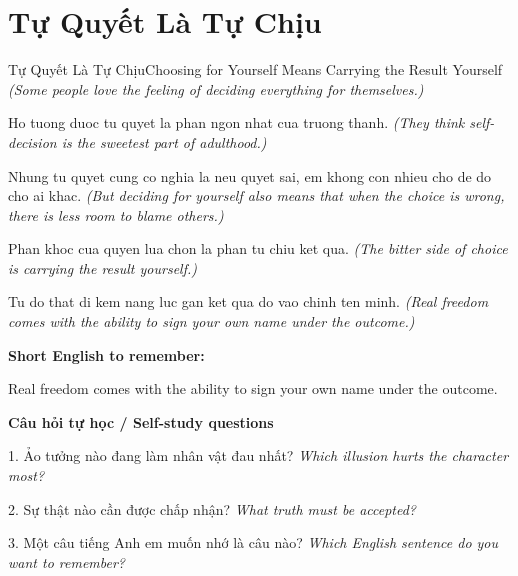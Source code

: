 \section{Tự Quyết Là Tự Chịu}
\begin{truyen}{Tự Quyết Là Tự Chịu}{Choosing for Yourself Means Carrying the Result Yourself}
\textit{(Some people love the feeling of deciding everything for themselves.)}

Ho tuong duoc tu quyet la phan ngon nhat cua truong thanh.
\textit{(They think self-decision is the sweetest part of adulthood.)}

Nhung tu quyet cung co nghia la neu quyet sai, em khong con nhieu cho de do cho ai khac.
\textit{(But deciding for yourself also means that when the choice is wrong, there is less room to blame others.)}

Phan khoc cua quyen lua chon la phan tu chiu ket qua.
\textit{(The bitter side of choice is carrying the result yourself.)}

\end{truyen}

\begin{baihoc}
Tu do that di kem nang luc gan ket qua do vao chinh ten minh.
\textit{(Real freedom comes with the ability to sign your own name under the outcome.)}
\end{baihoc}

\begin{ghinhoanh}
\textbf{Short English to remember:}

Real freedom comes with the ability to sign your own name under the outcome.

\end{ghinhoanh}

\begin{tuhocnhanh}
\textbf{Câu hỏi tự học / Self-study questions}

1. Ảo tưởng nào đang làm nhân vật đau nhất? \textit{Which illusion hurts the character most?}

2. Sự thật nào cần được chấp nhận? \textit{What truth must be accepted?}

3. Một câu tiếng Anh em muốn nhớ là câu nào? \textit{Which English sentence do you want to remember?}
\end{tuhocnhanh}
\ngancach

